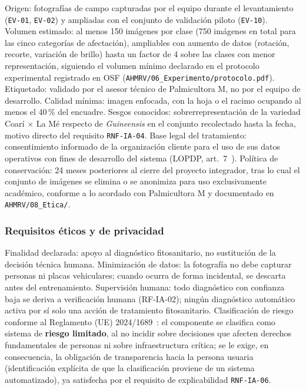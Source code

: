 \documentclass[11pt,a4paper]{article}
\newcommand{\id}[1]{\texttt{#1}}
\begin{document}
Origen: fotografías de campo capturadas por el equipo durante el levantamiento (\id{EV-01},
\id{EV-02}) y ampliadas con el conjunto de validación piloto (\id{EV-10}). Volumen estimado:
al menos 150 imágenes por clase (750 imágenes en total para las cinco categorías de afectación),
ampliables con aumento de datos (rotación, recorte, variación de brillo) hasta un factor de 4
sobre las clases con menor representación, siguiendo el volumen mínimo declarado en el protocolo
experimental registrado en OSF (\id{AHMRV/06\_Experimento/protocolo.pdf}). Etiquetado: validado por
el asesor técnico de Palmicultora M, no por el equipo de desarrollo. Calidad mínima: imagen
enfocada, con la hoja o el racimo ocupando al menos el 40\,\% del encuadre. Sesgos conocidos:
sobrerrepresentación de la variedad Coarí $\times$ La Mé respecto de \emph{Guineensis} en el
conjunto recolectado hasta la fecha, motivo directo del requisito \id{RNF-IA-04}. Base legal del
tratamiento: consentimiento informado de la organización cliente para el uso de sus datos
operativos con fines de desarrollo del sistema (LOPDP, art.\ 7~\cite{lopdp2021}). Política de
conservación: 24 meses posteriores al cierre del proyecto integrador, tras lo cual el conjunto de
imágenes se elimina o se anonimiza para uso exclusivamente académico, conforme a lo acordado con
Palmicultora M y documentado en \id{AHMRV/08\_Etica/}.

\subsubsection{Requisitos éticos y de privacidad}

Finalidad declarada: apoyo al diagnóstico fitosanitario, no sustitución de la decisión técnica
humana. Minimización de datos: la fotografía no debe capturar personas ni placas vehiculares;
cuando ocurra de forma incidental, se descarta antes del entrenamiento. Supervisión humana: todo
diagnóstico con confianza baja se deriva a verificación humana (RF-IA-02); ningún diagnóstico
automático activa por sí solo una acción de tratamiento fitosanitario. Clasificación de riesgo
conforme al Reglamento (UE) 2024/1689~\cite{euaiact2024}: el componente se clasifica como sistema
de \textbf{riesgo limitado}, al no incidir sobre decisiones que afecten derechos fundamentales de
personas ni sobre infraestructura crítica; se le exige, en consecuencia, la obligación de
transparencia hacia la persona usuaria (identificación explícita de que la clasificación proviene
de un sistema automatizado), ya satisfecha por el requisito de explicabilidad \id{RNF-IA-06}.
\end{document}
